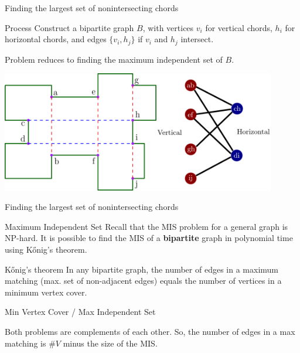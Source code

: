 \documentclass{beamer}
\begin{document}
\begin{frame}[t]{Finding the largest set of nonintersecting chords}	
	\begin{block}{Process}
	Construct a bipartite graph $B$, with vertices $v_i$ for vertical chords, $h_i$ for horizontal chords, and edges $\{v_i, h_j\}$ if $v_i$ and $h_j$ intersect.
	
	Problem reduces to finding the maximum independent set of $B$.

	
	\end{block}
	\centering
    \includegraphics[width=0.9\textwidth]{graph0.png}

\end{frame}

\begin{frame}[t]{Finding the largest set of nonintersecting chords}	
	\begin{block}{Maximum Independent Set}
	Recall that the MIS problem for a general graph is NP-hard. 	
	It is possible to find the MIS of a \textbf{bipartite} graph in polynomial time using Kőnig's theorem.
	
	\end{block}

	\begin{block}{Kőnig's theorem}
    In any bipartite graph, the number of edges in a maximum matching (max. set of non-adjacent edges) equals the number of vertices in a minimum vertex cover.
    	
	\end{block}

	\begin{block}{Min Vertex Cover / Max Independent Set}
	
	Both problems are complements of each other. So, the number of edges in a max matching is $\#V$ minus the size of the MIS.	
	    	
	\end{block}

\end{frame}
\end{document}
